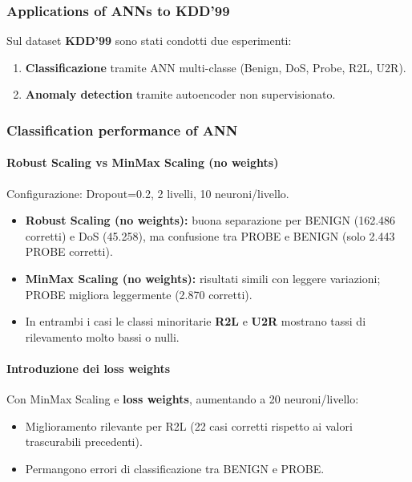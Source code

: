 \subsubsection{Applications of ANNs to KDD'99}

Sul dataset \textbf{KDD'99} sono stati condotti due esperimenti:
\begin{enumerate}
    \item \textbf{Classificazione} tramite ANN multi-classe (Benign, DoS, Probe, R2L, U2R).
    \item \textbf{Anomaly detection} tramite autoencoder non supervisionato.
\end{enumerate}

\subsubsection{Classification performance of ANN}

\paragraph{Robust Scaling vs MinMax Scaling (no weights)}
Configurazione: Dropout=0.2, 2 livelli, 10 neuroni/livello.
\begin{itemize}
    \item \textbf{Robust Scaling (no weights):} buona separazione per
    BENIGN (162.486 corretti) e DoS (45.258), ma confusione tra PROBE e
    BENIGN (solo 2.443 PROBE corretti).
    \item \textbf{MinMax Scaling (no weights):} risultati simili con
    leggere variazioni; PROBE migliora leggermente (2.870 corretti).
    \item In entrambi i casi le classi minoritarie \textbf{R2L} e
    \textbf{U2R} mostrano tassi di rilevamento molto bassi o nulli.
\end{itemize}

\paragraph{Introduzione dei loss weights}
Con MinMax Scaling e \textbf{loss weights}, aumentando a 20 neuroni/livello:
\begin{itemize}
    \item Miglioramento rilevante per R2L (22 casi corretti rispetto ai valori trascurabili precedenti).
    \item Permangono errori di classificazione tra BENIGN e PROBE.
\end{itemize}

